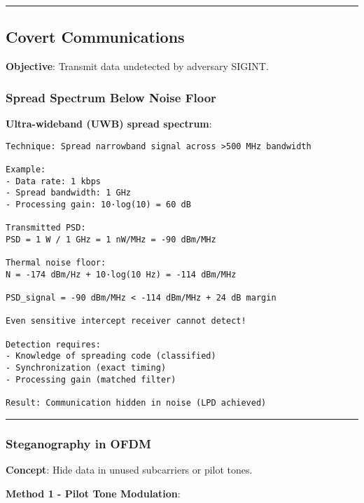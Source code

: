 \begin{center}\rule{0.5\linewidth}{0.5pt}\end{center}

\subsection{\texorpdfstring{ Covert
Communications}{ Covert Communications}}\label{covert-communications}

\textbf{Objective}: Transmit data undetected by adversary SIGINT.

\subsubsection{Spread Spectrum Below Noise
Floor}\label{spread-spectrum-below-noise-floor}

\textbf{Ultra-wideband (UWB) spread spectrum}:

\begin{verbatim}
Technique: Spread narrowband signal across >500 MHz bandwidth

Example:
- Data rate: 1 kbps
- Spread bandwidth: 1 GHz
- Processing gain: 10·log(10) = 60 dB

Transmitted PSD:
PSD = 1 W / 1 GHz = 1 nW/MHz = -90 dBm/MHz

Thermal noise floor:
N = -174 dBm/Hz + 10·log(10 Hz) = -114 dBm/MHz

PSD_signal = -90 dBm/MHz < -114 dBm/MHz + 24 dB margin

Even sensitive intercept receiver cannot detect!

Detection requires:
- Knowledge of spreading code (classified)
- Synchronization (exact timing)
- Processing gain (matched filter)

Result: Communication hidden in noise (LPD achieved)
\end{verbatim}

\begin{center}\rule{0.5\linewidth}{0.5pt}\end{center}

\subsubsection{Steganography in OFDM}\label{steganography-in-ofdm}

\textbf{Concept}: Hide data in unused subcarriers or pilot tones.

\textbf{Method 1 - Pilot Tone Modulation}:

